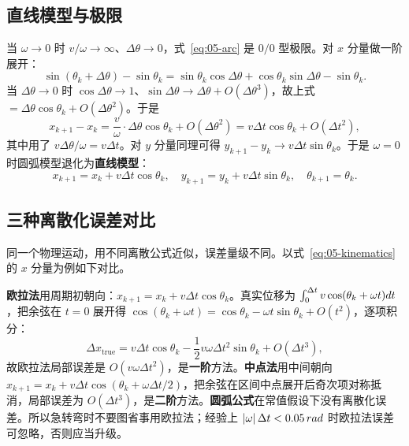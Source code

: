\subsection{直线模型与极限}

当 $\omega\to0$ 时 $v/\omega\to\infty$、$\Delta\theta\to0$，式~\eqref{eq:05-arc} 是 $0/0$ 型极限。对 $x$ 分量做一阶展开：
\begin{equation}
  \sin\left(\theta_k+\Delta\theta\right)-\sin\theta_k
  = \sin\theta_k\cos\Delta\theta+\cos\theta_k\sin\Delta\theta-\sin\theta_k.
\end{equation}
当 $\Delta\theta\to0$ 时 $\cos\Delta\theta\to1$、$\sin\Delta\theta\to\Delta\theta+O(\Delta\theta^{3})$，故上式 $=\Delta\theta\cos\theta_k+O(\Delta\theta^{2})$。于是
\begin{equation}
  x_{k+1}-x_k = \frac{v}{\omega}\cdot\Delta\theta\cos\theta_k + O(\Delta\theta^{2})
  = v\Delta t\cos\theta_k + O(\Delta t^{2}),
\end{equation}
其中用了 $v\Delta\theta/\omega = v\Delta t$。对 $y$ 分量同理可得 $y_{k+1}-y_k\to v\Delta t\sin\theta_k$。于是 $\omega=0$ 时圆弧模型退化为\textbf{直线模型}：
\begin{equation}
  x_{k+1}=x_k+v\Delta t\cos\theta_k,\quad
  y_{k+1}=y_k+v\Delta t\sin\theta_k,\quad
  \theta_{k+1}=\theta_k.
  \label{eq:05-line}
\end{equation}

\subsection{三种离散化误差对比}

同一个物理运动，用不同离散公式近似，误差量级不同。以式~\eqref{eq:05-kinematics} 的 $x$ 分量为例如下对比。

\textbf{欧拉法}用周期初朝向：$x_{k+1}=x_k+v\Delta t\cos\theta_k$。真实位移为 $\int_0^{\Delta t}v\cos(\theta_k+\omega t)d t$，把余弦在 $t=0$ 展开得 $\cos(\theta_k+\omega t)=\cos\theta_k-\omega t\sin\theta_k+O(t^{2})$，逐项积分：
\begin{equation}
  \Delta x_{\text{true}} = v\Delta t\cos\theta_k - \frac{1}{2}v\omega\Delta t^{2}\sin\theta_k+O(\Delta t^{3}),
\end{equation}
故欧拉法局部误差是 $O(v\omega\Delta t^{2})$，是\textbf{一阶}方法。\textbf{中点法}用中间朝向 $x_{k+1}=x_k+v\Delta t\cos(\theta_k+\omega\Delta t/2)$，把余弦在区间中点展开后奇次项对称抵消，局部误差为 $O(\Delta t^{3})$，是\textbf{二阶}方法。\textbf{圆弧公式}在常值假设下没有离散化误差。所以急转弯时不要图省事用欧拉法；经验上 $\left\lvert \omega \right\rvert\Delta t<0.05\,rad$ 时欧拉法误差可忽略，否则应当升级。

